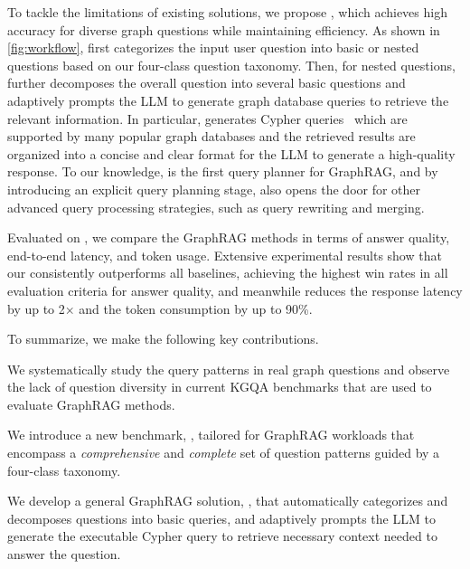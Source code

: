 To tackle the limitations of existing solutions, we propose \name{}, which achieves high accuracy for diverse graph questions while maintaining efficiency. As shown in \autoref{fig:workflow}, \name{} first categorizes the input user question into basic or nested questions based on our four-class question taxonomy. Then, for nested questions, \name{} further decomposes the overall question into several basic questions and adaptively prompts the LLM to generate graph database queries to retrieve the relevant information.  In particular, \name{} generates Cypher queries~\cite{cypher} which are supported by many popular graph databases and the retrieved results are organized into a concise and clear format for the LLM to generate a high-quality response. To our knowledge, \name{} is the first query planner for GraphRAG, and by introducing an explicit query planning stage, \name{} also opens the door for 
other advanced query processing strategies, such as query rewriting and merging.    




Evaluated on \benchmarkname{}, we compare the GraphRAG methods in terms of answer quality, end-to-end latency, and token usage. Extensive experimental results show that our \name{} consistently outperforms all baselines, achieving the highest win rates in all evaluation criteria for answer quality, and meanwhile reduces the response latency by up to 2× and the token consumption by up to 90\%.

To summarize, we make the following key contributions.

\squishlist
\item We systematically study the query patterns in real graph questions and observe the lack of question diversity in current KGQA benchmarks that are used to evaluate GraphRAG methods.
\item We introduce a new benchmark, \benchmarkname{}, tailored for GraphRAG workloads that encompass a \textit{comprehensive} and \textit{complete} set of question patterns guided by a four-class taxonomy.
\item We develop a general GraphRAG solution, \name{}, that automatically categorizes and decomposes questions into basic queries, and adaptively prompts the LLM to generate the executable Cypher query to retrieve necessary context needed to answer the question.
\squishend


